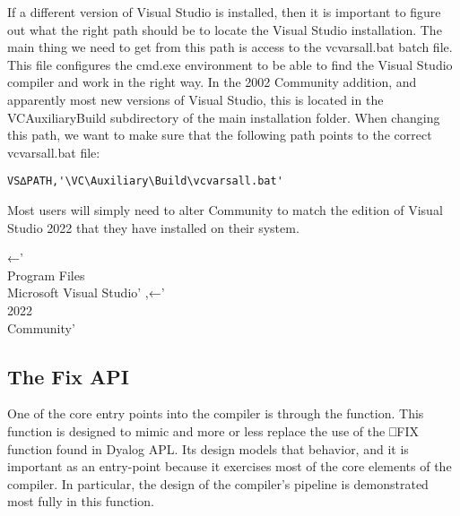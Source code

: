 \documentclass{article}%
\begin{document}
If a different version of Visual Studio is installed, then it is 
important to figure out what the right path should be to locate 
the Visual Studio installation. 
The main thing we need to get from this path is access 
to the {\Tt{}vcvarsall.bat\nwendquote} batch file.
This file configures the {\Tt{}cmd.exe\nwendquote} environment to be able to 
find the Visual Studio compiler and work in the right way.
In the 2002 Community addition, and apparently most new versions 
of Visual Studio, this is located in the {\Tt{}VC{\nwbackslash}Auxiliary{\nwbackslash}Build{\nwbackslash}\nwendquote}
subdirectory of the main installation folder.
When changing this path, we want to make sure that the following
path points to the correct {\Tt{}vcvarsall.bat\nwendquote} file:

\begin{verbatim}
VS∆PATH,'\VC\Auxiliary\Build\vcvarsall.bat'
\end{verbatim}

\noindent
Most users will simply need to alter {\Tt{}Community\nwendquote} to match the 
edition of Visual Studio 2022 that they have installed on their 
system.

\nwenddocs{}\plusendmoddef\nwstartdeflinemarkup{}\nwenddeflinemarkup
{}←'\\Program Files\\Microsoft Visual Studio'
,←'\\2022\\Community'
\eatline
{}\nwendcode{}\nwdocspar
\subsection{The Fix API}

One of the core entry points into the compiler is through the {\Tt{}\nwendquote}
function.
This function is designed to mimic and more or less replace the
use of the {\Tt{}⎕FIX\nwendquote} function found in Dyalog APL.
Its design models that behavior, and it is important as an entry-point
because it exercises most of the core elements of the compiler.
In particular, the design of the compiler's pipeline is demonstrated
most fully in this function.
\end{document}
